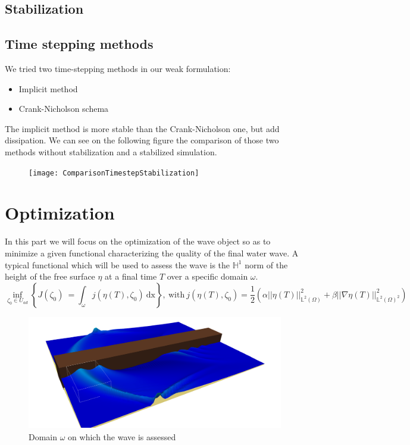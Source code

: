 \documentclass[11pt,a4paper]{article}
\begin{document}
		\subsection{Stabilization}
			\pagebreak
		\subsection{Time stepping methods}
			We tried two time-stepping methods in our weak formulation:
			\begin{itemize}
				\item Implicit method
				\item Crank-Nicholson schema
			\end{itemize}
			The implicit method is more stable than the Crank-Nicholson one, but add dissipation. We can see on the following figure the comparison of those two methods without stabilization and a stabilized simulation.
			\begin{figure}[!h]
				 \texttt{[image: ComparisonTimestepStabilization]}
			\end{figure}
			
			\pagebreak				
	\section{Optimization}
		In this part we will focus on the optimization of the wave object so as to minimize a given functional characterizing the quality of the final water wave.
		A typical functional which will be used to assess the wave is the $\mathbb{H}^1$ norm of the height of the free surface  $\eta$ at a final time $T$ over a specific domain $\omega$.
		\begin{equation}
			\inf_{\zeta_0 \in U_{ad}}\left\{J(\zeta_0)\ = \int_{\omega}{\! j(\eta(T),\zeta_0) \: \mathrm{dx}} \right\}, \: \mathrm{with} \: j(\eta(T),\zeta_0) = \frac{1}{2}(\alpha ||\eta(T)||_{\mathbb{L}^2(\Omega)}^2 + \beta ||\nabla \eta(T)||_{\mathbb{L}^2(\Omega)^2}^2)
		\end{equation}
		\begin{figure}[!h]
			\centering
			\includegraphics[height=5cm]{OptimizationDomain}
			\caption{Domain $\omega$ on which the wave is assessed}
		\end{figure}
		
\end{document}

